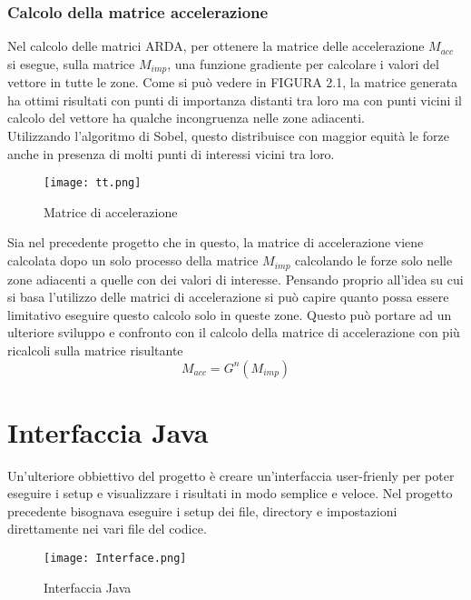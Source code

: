 \subsubsection{Calcolo della matrice accelerazione}
Nel calcolo delle matrici ARDA, per ottenere la matrice delle accelerazione $M_{acc}$ si esegue, sulla
matrice $M_{imp}$, una funzione gradiente per calcolare i valori del vettore in tutte le zone. Come si pu\`o
vedere in FIGURA 2.1, la matrice generata ha ottimi risultati con punti di importanza distanti tra loro
ma con punti vicini il calcolo del vettore ha qualche incongruenza nelle zone adiacenti.\\
Utilizzando l'algoritmo di Sobel, questo distribuisce con maggior equit\`a le forze anche in presenza di
molti punti di interessi vicini tra loro.\\
\begin{figure}
    \begin{center}
    \texttt{[image: tt.png]}
    \caption[Macc]{Matrice di accelerazione}
    \label{etichetta}
    \end{center}
\end{figure}
Sia nel precedente progetto che in questo, la matrice di accelerazione viene calcolata dopo un solo processo
della matrice $M_{imp}$ calcolando le forze solo nelle zone adiacenti a quelle con dei valori di interesse.
Pensando proprio all'idea su cui si basa l'utilizzo delle matrici di accelerazione si pu\`o capire quanto possa
essere limitativo eseguire questo calcolo solo in queste zone. Questo pu\`o portare ad un ulteriore sviluppo e
confronto con il calcolo della matrice di accelerazione con pi\`u ricalcoli sulla matrice risultante
\begin{equation}
M_{acc} = G^{n}(M_{imp})
\end{equation}

\section{Interfaccia Java}
Un'ulteriore obbiettivo del progetto \`e creare un'interfaccia user-frienly per poter eseguire i setup e visualizzare
i risultati in modo semplice e veloce. Nel progetto precedente bisognava eseguire i setup dei file,
directory e impostazioni direttamente nei vari file del codice.\\

\begin{figure}[h]
    \begin{center}
    \texttt{[image: Interface.png]}
    \caption[IntJava]{Interfaccia Java}
    \label{etichetta}
    \end{center}
\end{figure}


